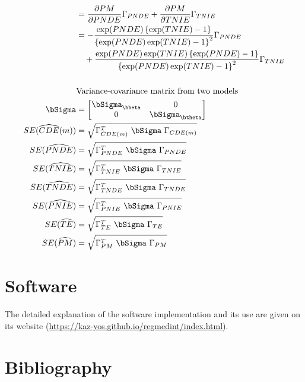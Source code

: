 \documentclass[dvipdfmx,10pt]{article}
\begin{document}
\begin{align*}
  &= \frac{\partial PM}{\partial PNDE}\Gamma_{PNDE} + \frac{\partial PM}{\partial TNIE}\Gamma_{TNIE}\\
  &= - \frac{\exp(PNDE)\left\{ \exp(TNIE) - 1 \right\}}{\left\{ \exp(PNDE)\exp(TNIE) - 1 \right\}^{2}} \Gamma_{PNDE}\\
  &~~~ + \frac{\exp(PNDE)\exp(TNIE)\left\{ \exp(PNDE) - 1 \right\}}{\left\{ \exp(PNDE)\exp(TNIE) - 1 \right\}^{2}} \Gamma_{TNIE}\\
  \\
  &\text{Variance-covariance matrix from two models}\\
  \bSigma &=
           \begin{bmatrix}
             \bSigma_{\bbeta} & 0 \\
             0 & \bSigma_{\btheta} \\
           \end{bmatrix}\\
  SE(\widehat{CDE}(m)) &= \sqrt{\Gamma_{CDE(m)}^{T} ~\bSigma~ \Gamma_{CDE(m)}}\\
  SE(\widehat{PNDE}) &= \sqrt{\Gamma_{PNDE}^{T} ~\bSigma~ \Gamma_{PNDE}}\\
  SE(\widehat{TNIE}) &= \sqrt{\Gamma_{TNIE}^{T} ~\bSigma~ \Gamma_{TNIE}}\\
  SE(\widehat{TNDE}) &= \sqrt{\Gamma_{TNDE}^{T} ~\bSigma~ \Gamma_{TNDE}}\\
  SE(\widehat{PNIE}) &= \sqrt{\Gamma_{PNIE}^{T} ~\bSigma~ \Gamma_{PNIE}}\\
  SE(\widehat{TE}) &= \sqrt{\Gamma_{TE}^{T} ~\bSigma~ \Gamma_{TE}}\\
  SE(\widehat{PM}) &= \sqrt{\Gamma_{PM}^{T} ~\bSigma~ \Gamma_{PM}}\\
\end{align*}


\section{Software}
\label{sec:org506e2fa}
The detailed explanation of the software implementation and its use are given on its website (\url{https://kaz-yos.github.io/regmedint/index.html}).

\section{Bibliography}
\label{sec:org0ba3417}
\renewcommand{\section}[2]{}



\end{document}
